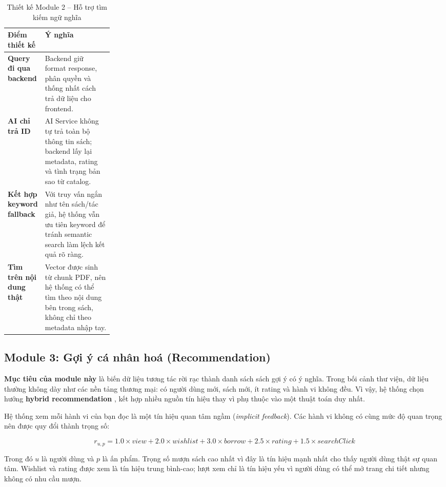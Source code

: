 \begin{table}[H]
\centering
\small
\renewcommand{\arraystretch}{1.15}
\setlength{\tabcolsep}{5pt}
\begin{tabularx}{\linewidth}{|>{\bfseries}p{0.24\linewidth}|>{\raggedright\arraybackslash}X|}
\hline
\textbf{Điểm thiết kế} & \textbf{Ý nghĩa} \\
\hline
\textbf{Query đi qua backend} & Backend giữ format response, phân quyền và thống nhất cách trả dữ liệu cho frontend. \\
\hline
\textbf{AI chỉ trả ID} & AI Service không tự trả toàn bộ thông tin sách; backend lấy lại metadata, rating và tình trạng bản sao từ catalog. \\
\hline
\textbf{Kết hợp keyword fallback} & Với truy vấn ngắn như tên sách/tác giả, hệ thống vẫn ưu tiên keyword để tránh semantic search làm lệch kết quả rõ ràng. \\
\hline
\textbf{Tìm trên nội dung thật} & Vector được sinh từ chunk PDF, nên hệ thống có thể tìm theo nội dung bên trong sách, không chỉ theo metadata nhập tay. \\
\hline
\end{tabularx}
\caption{Thiết kế Module 2 -- Hỗ trợ tìm kiếm ngữ nghĩa}
\label{tab:ai_module_semantic_search}
\end{table}

\subsection{Module 3: Gợi ý cá nhân hoá (Recommendation)}

\textbf{Mục tiêu của module này} là biến dữ liệu tương tác rời rạc thành danh sách sách gợi ý có ý nghĩa. Trong bối cảnh thư viện, dữ liệu thường không dày như các nền tảng thương mại: có người dùng mới, sách mới, ít rating và hành vi không đều. Vì vậy, hệ thống chọn hướng \textbf{hybrid recommendation} \cite{Burke2002Hybrid}, kết hợp nhiều nguồn tín hiệu thay vì phụ thuộc vào một thuật toán duy nhất.

Hệ thống xem mỗi hành vi của bạn đọc là một tín hiệu quan tâm ngầm
(\textit{implicit feedback}). Các hành vi không có cùng mức độ quan trọng nên
được quy đổi thành trọng số:

\[
r_{u,p} =
1.0 \times view
+ 2.0 \times wishlist
+ 3.0 \times borrow
+ 2.5 \times rating
+ 1.5 \times searchClick
\]

Trong đó $u$ là người dùng và $p$ là ấn phẩm. Trọng số mượn sách cao nhất vì đây
là tín hiệu mạnh nhất cho thấy người dùng thật sự quan tâm. Wishlist và rating
được xem là tín hiệu trung bình-cao; lượt xem chỉ là tín hiệu yếu vì người dùng
có thể mở trang chi tiết nhưng không có nhu cầu mượn.

